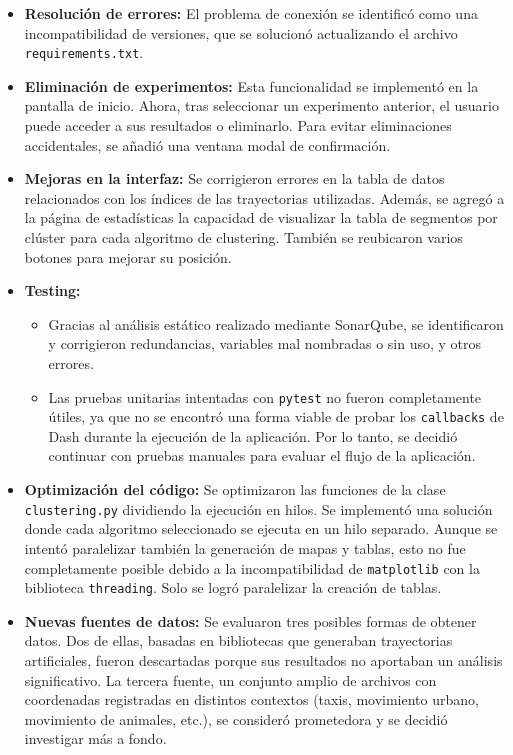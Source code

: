 \begin{itemize}
    \item \textbf{Resolución de errores:} El problema de conexión se identificó como una incompatibilidad de versiones, que se solucionó actualizando el archivo \texttt{requirements.txt}.
    \item \textbf{Eliminación de experimentos:} Esta funcionalidad se implementó en la pantalla de inicio. Ahora, tras seleccionar un experimento anterior, el usuario puede acceder a sus resultados o eliminarlo. Para evitar eliminaciones accidentales, se añadió una ventana modal de confirmación.
    \item \textbf{Mejoras en la interfaz:} Se corrigieron errores en la tabla de datos relacionados con los índices de las trayectorias utilizadas. Además, se agregó a la página de estadísticas la capacidad de visualizar la tabla de segmentos por clúster para cada algoritmo de clustering. También se reubicaron varios botones para mejorar su posición.
    \item \textbf{Testing:}
    \begin{itemize}
        \item Gracias al análisis estático realizado mediante SonarQube, se identificaron y corrigieron redundancias, variables mal nombradas o sin uso, y otros errores.
        \item Las pruebas unitarias intentadas con \texttt{pytest} no fueron completamente útiles, ya que no se encontró una forma viable de probar los \texttt{callbacks} de Dash durante la ejecución de la aplicación. Por lo tanto, se decidió continuar con pruebas manuales para evaluar el flujo de la aplicación.
    \end{itemize}
    \item \textbf{Optimización del código:} 
    Se optimizaron las funciones de la clase \texttt{clustering.py} dividiendo la ejecución en hilos. Se implementó una solución donde cada algoritmo seleccionado se ejecuta en un hilo separado. Aunque se intentó paralelizar también la generación de mapas y tablas, esto no fue completamente posible debido a la incompatibilidad de \texttt{matplotlib} con la biblioteca \texttt{threading}. Solo se logró paralelizar la creación de tablas.
    \item \textbf{Nuevas fuentes de datos:} 
    Se evaluaron tres posibles formas de obtener datos. Dos de ellas, basadas en bibliotecas que generaban trayectorias artificiales, fueron descartadas porque sus resultados no aportaban un análisis significativo. La tercera fuente, un conjunto amplio de archivos con coordenadas registradas en distintos contextos (taxis, movimiento urbano, movimiento de animales, etc.), se consideró prometedora y se decidió investigar más a fondo.
\end{itemize}

